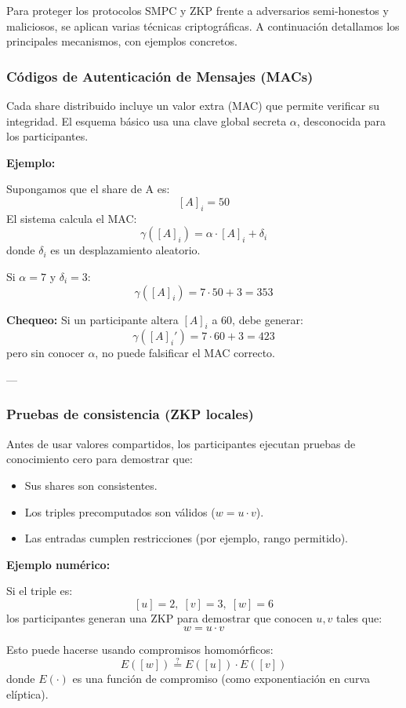 \documentclass{article}
\begin{document}
Para proteger los protocolos SMPC y ZKP frente a adversarios semi-honestos y maliciosos, se aplican varias técnicas criptográficas. A continuación detallamos los principales mecanismos, con ejemplos concretos.

\subsubsection{Códigos de Autenticación de Mensajes (MACs)}

Cada share distribuido incluye un valor extra (MAC) que permite verificar su integridad. El esquema básico usa una clave global secreta \( \alpha \), desconocida para los participantes.

\textbf{Ejemplo:}

Supongamos que el share de A es:
\[
[A]_i = 50
\]
El sistema calcula el MAC:
\[
\gamma([A]_i) = \alpha \cdot [A]_i + \delta_i
\]
donde \( \delta_i \) es un desplazamiento aleatorio.

Si \( \alpha = 7 \) y \( \delta_i = 3 \):
\[
\gamma([A]_i) = 7 \cdot 50 + 3 = 353
\]

\textbf{Chequeo:}  
Si un participante altera \( [A]_i \) a 60, debe generar:
\[
\gamma([A]_i') = 7 \cdot 60 + 3 = 423
\]
pero sin conocer \( \alpha \), no puede falsificar el MAC correcto.

---

\subsubsection{Pruebas de consistencia (ZKP locales)}

Antes de usar valores compartidos, los participantes ejecutan pruebas de conocimiento cero para demostrar que:
\begin{itemize}
    \item Sus shares son consistentes.
    \item Los triples precomputados son válidos (\( w = u \cdot v \)).
    \item Las entradas cumplen restricciones (por ejemplo, rango permitido).
\end{itemize}

\textbf{Ejemplo numérico:}

Si el triple es:
\[
[u] = 2, \; [v] = 3, \; [w] = 6
\]
los participantes generan una ZKP para demostrar que conocen \( u, v \) tales que:
\[
w = u \cdot v
\]

Esto puede hacerse usando compromisos homomórficos:
\[
E([w]) \stackrel{?}{=} E([u]) \cdot E([v])
\]
donde \( E(\cdot) \) es una función de compromiso (como exponentiación en curva elíptica).
\end{document}
